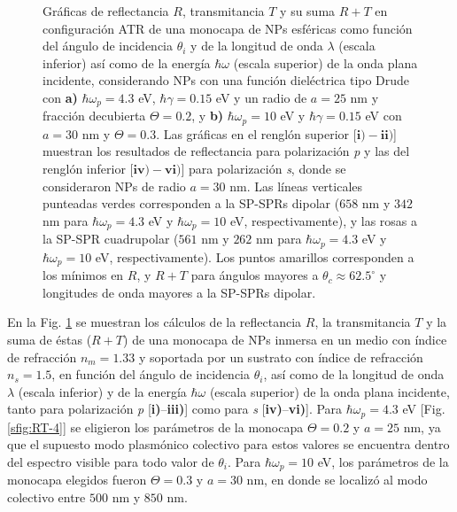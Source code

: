 \begin{figure}[h!]
\begin{subfigure}{.7\linewidth}
		\end{subfigure}\vspace*{-.5em}
	\caption{Gráficas de reflectancia $R$, transmitancia $T$ y su suma $R+T$ en configuración ATR de una monocapa de NPs esféricas como función del ángulo de incidencia $\theta_i$ y de la longitud de onda $\lambda$ (escala inferior) así como de la energía $\hbar\omega$ (escala superior) de la onda plana incidente, considerando NPs con una función dieléctrica tipo Drude con \textbf{a)} $\hbar\omega_p=4. 3$ eV,  $\hbar\gamma=0. 15$ eV y un radio de $a=25$ nm y fracción decubierta $\Theta=0.2$, y \textbf{b)} $\hbar\omega_p = 10$ eV y $\hbar\gamma = 0.15$ eV con $a=30$ nm y $\Theta=0.3$.  Las gráficas   en el renglón superior [$\mathbf{i)-ii)}$]  muestran los resultados de reflectancia para  polarización \emph{p} y las del renglón inferior  [$\mathbf{iv)-vi)}$] para polarización  \emph{s}, donde se consideraron NPs de radio $a=30$ nm. Las líneas verticales punteadas verdes corresponden a la SP-SPRs dipolar ($658$ nm y $342$ nm para $\hbar\omega_p=4.3$ eV y $\hbar\omega_p = 10$ eV, respectivamente), y las rosas a la SP-SPR cuadrupolar ($561$ nm y $262$ nm para $\hbar\omega_p=4.3$ eV y $\hbar\omega_p = 10$ eV, respectivamente). Los puntos amarillos corresponden a los mínimos en $R$, y $R+T$ para ángulos mayores a $\theta_c\approx 62.5^\circ$ y longitudes de onda mayores a la SP-SPRs dipolar. }\label{fig:RT-Omegas}
	\end{figure}	

En la Fig. \ref{fig:RT-Omegas} se muestran los cálculos de la reflectancia $R$, la transmitancia $T$ y la suma de éstas ($R+T$) de una monocapa de NPs inmersa en un medio con índice de refracción $n_m=1.33$ y soportada por un sustrato con índice de refracción $n_s=1.5$, en función del ángulo de incidencia $\theta_i$, así como de la longitud de onda $\lambda$ (escala inferior) y de la energía  $\hbar\omega$ (escala superior) de la onda plana incidente, tanto para polarización \emph{p}  [\textbf{i)}--\textbf{iii)}] como para \emph{s} [\textbf{iv)}--\textbf{vi)}]. Para $\hbar\omega_p=4.3$ eV [Fig. \ref{sfig:RT-4}] se eligieron los parámetros de la monocapa $\Theta=0.2$ y $a=25$ nm, ya que el supuesto modo plasmónico colectivo para estos valores se encuentra dentro del espectro visible para todo valor de $\theta_i$. Para $\hbar\omega_p=10$ eV, los parámetros de la monocapa elegidos fueron $\Theta=0.3$ y $a=30$ nm, en donde se localizó al modo colectivo entre $500$ nm y $850$ nm.

